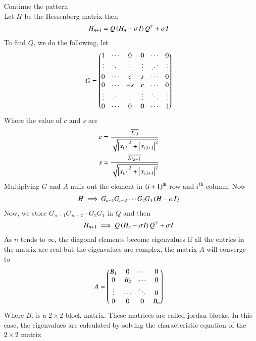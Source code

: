 \documentclass[journal]{IEEEtran}
\begin{document}
	Continue the pattern\\
	Let $H$ be the Hessenberg matrix then
	\begin{align}
		H_{n+1} = Q\left(H_n - \sigma I\right)Q^\top + \sigma I
	\end{align}
	To find $Q$, we do the following, let
	\begin{align}
		G = \myvec{
			1 & \cdots & 0 & 0 & \cdots & 0 \\
			\vdots & \ddots & \vdots & \vdots & \reflectbox{$\ddots$} & \vdots \\
			0 & \cdots & c & s & \cdots & 0\\
			0 & \cdots & -s & c & \cdots & 0\\
			\vdots & \reflectbox{$\ddots$} & \vdots & \vdots & \ddots & \vdots\\
			0 & \cdots & 0 & 0 & \cdots & 1
		}
	\end{align}
	Where the value of $c$ and $s$ are
	\begin{align}
		c = \frac{\overline{x_{i,i}}}{\sqrt{\left\vert x_{i,i}\right\vert^2+\left\vert x_{i,i+1}\right\vert^2}}\\
		s = \frac{\overline{x_{i,i+1}}}{\sqrt{\left\vert x_{i,i}\right\vert^2+\left\vert x_{i,i+1}\right\vert^2}}
	\end{align}
	Multiplying $G$ and $A$ nulls out the element in $\left(i+1\right)^{\text{th}}$ row and $i^\text{th}$ column. Now
	\begin{align}
		H \implies G_{n-1}G_{n-2}\cdots G_2G_1\left(H - \sigma I\right)
	\end{align}
	Now, we store $G_{n-1}G_{n-2}\cdots G_2G_1$ in $Q$ and then
	\begin{align}
		H_{n+1} \implies Q\left(H_n - \sigma I\right)Q^\top+ \sigma I\\
	\end{align}
	As $n$ tends to $\infty$, the diagonal elements become eigenvalues
	If all the entries in the matrix are real but the eigenvalues are complex, the matrix $A$ will converge to
	\begin{align}
		A = \begin{pmatrix}B_1 & 0 & \cdots & 0 \\
			0 & B_2 & \cdots & 0\\
			\vdots & \cdots & \ddots & 0\\
			0 & 0 & 0 & B_n\end{pmatrix}
	\end{align}
	Where $B_i$ is a $2 \times 2$ block matrix. These matrices are called jordan blocks. In this case, the eigenvalues are calculated by solving the characteristic equation of the $2 \times 2$ matrix
\end{document}
